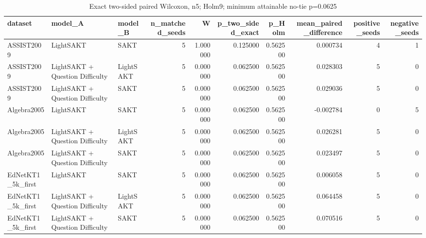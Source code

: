 \begin{table}
\caption{Exact two-sided paired Wilcoxon, n5; Holm9; minimum attainable no-tie p=0.0625}
\begin{tabular}{lllrrrrrrr}
\toprule
dataset & model\_A & model\_B & n\_matched\_seeds & W & p\_two\_sided\_exact & p\_Holm & mean\_paired\_difference & positive\_seeds & negative\_seeds \\
\midrule
ASSIST2009 & LightSAKT & SAKT & 5 & 1.000000 & 0.125000 & 0.562500 & 0.000734 & 4 & 1 \\
ASSIST2009 & LightSAKT + Question Difficulty & LightSAKT & 5 & 0.000000 & 0.062500 & 0.562500 & 0.028303 & 5 & 0 \\
ASSIST2009 & LightSAKT + Question Difficulty & SAKT & 5 & 0.000000 & 0.062500 & 0.562500 & 0.029036 & 5 & 0 \\
Algebra2005 & LightSAKT & SAKT & 5 & 0.000000 & 0.062500 & 0.562500 & -0.002784 & 0 & 5 \\
Algebra2005 & LightSAKT + Question Difficulty & LightSAKT & 5 & 0.000000 & 0.062500 & 0.562500 & 0.026281 & 5 & 0 \\
Algebra2005 & LightSAKT + Question Difficulty & SAKT & 5 & 0.000000 & 0.062500 & 0.562500 & 0.023497 & 5 & 0 \\
EdNetKT1\_5k\_first & LightSAKT & SAKT & 5 & 0.000000 & 0.062500 & 0.562500 & 0.006058 & 5 & 0 \\
EdNetKT1\_5k\_first & LightSAKT + Question Difficulty & LightSAKT & 5 & 0.000000 & 0.062500 & 0.562500 & 0.064458 & 5 & 0 \\
EdNetKT1\_5k\_first & LightSAKT + Question Difficulty & SAKT & 5 & 0.000000 & 0.062500 & 0.562500 & 0.070516 & 5 & 0 \\
\bottomrule
\end{tabular}
\end{table}
